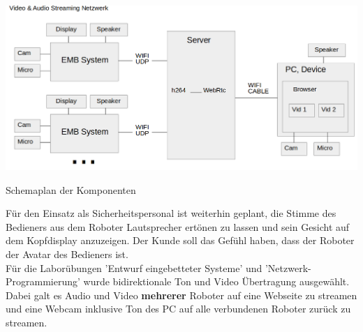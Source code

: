 \begin{minipage}{\textwidth}
    \begin{center}        
        \includegraphics[scale=0.4]{img/schemaproj.png} 
    \end{center}
\end{minipage}
\begin{center}
Schemaplan der Komponenten
\end{center}
Für den Einsatz als Sicherheitspersonal ist weiterhin geplant, die Stimme des Bedieners aus dem Roboter Lautsprecher ertönen zu lassen und sein Gesicht auf dem Kopfdisplay anzuzeigen. 
Der Kunde soll das Gefühl haben, dass der Roboter der Avatar des Bedieners ist.\\
Für die Laborübungen 'Entwurf eingebetteter Systeme' und 'Netzwerk-Programmierung' wurde 
bidirektionale Ton und Video Übertragung ausgewählt. Dabei galt es Audio und Video \textbf{mehrerer} Roboter auf eine Webseite zu streamen und eine Webcam inklusive Ton des PC auf alle verbundenen Roboter zurück zu streamen.\\

